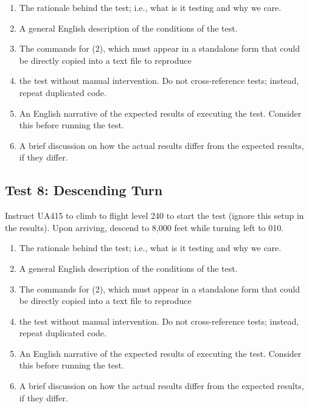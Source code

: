 \documentclass[letterpaper, 12pt]{article}
\begin{document}
\begin{enumerate}
\item The rationale behind the test; i.e., what is it testing and why we care.
\item A general English description of the conditions of the test.
\item The commands for (2), which must appear in a standalone form that could be directly copied into a text file to reproduce
\item the test without manual intervention. Do not cross-reference tests; instead, repeat duplicated code.
\item An English narrative of the expected results of executing the test. Consider this before running the test.
\item A brief discussion on how the actual results differ from the expected results, if they differ.
\end{enumerate}

\subsection{Test 8: Descending Turn}
Instruct UA415 to climb to flight level 240 to start the test (ignore this setup in the results). Upon arriving, descend to 8,000 feet while turning left to 010.
\begin{enumerate}
\item The rationale behind the test; i.e., what is it testing and why we care.
\item A general English description of the conditions of the test.
\item The commands for (2), which must appear in a standalone form that could be directly copied into a text file to reproduce
\item the test without manual intervention. Do not cross-reference tests; instead, repeat duplicated code.
\item An English narrative of the expected results of executing the test. Consider this before running the test.
\item A brief discussion on how the actual results differ from the expected results, if they differ.
\end{enumerate}
\end{document}
